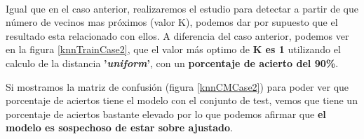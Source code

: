 \paragraph{}
Igual que en el caso anterior, realizaremos el estudio para detectar a partir de que número de vecinos mas próximos (valor K), podemos dar por supuesto que el resultado esta relacionado con ellos. A diferencia del caso anterior, podemos ver en la figura \ref{knnTrainCase2}, que el valor más optimo de \textbf{K es 1} utilizando el calculo de la distancia \textbf{'\textit{uniform}'}, con un \textbf{porcentaje de acierto del 90\%}.

Si mostramos la matriz de confusión\cite{ref:confusion_matrix} (figura \ref{knnCMCase2}) para poder ver que porcentaje de aciertos tiene el modelo con el conjunto de test, vemos que tiene un porcentaje de aciertos bastante elevado por lo que podemos afirmar que \textbf{el modelo es sospechoso de estar sobre ajustado\cite{ref:knn_overfiting}}.


